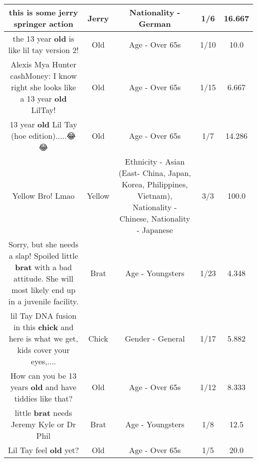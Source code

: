 \documentclass[11pt]{article}
\newlength\mylength
\begin{document}
\begin{center}
\begin{longtable}{|C{.65\mylength}|C{.30\mylength}|C{.12\mylength}|C{.12\mylength}|C{.12\mylength}|}
  \small this is some \textbf{jerry} springer action\normalsize   & Jerry & Nationality - German & 1/6 & 16.667 \\  \hline
  \small the 13 year \textbf{old} is like lil tay version 2!\normalsize   & Old & Age - Over 65s & 1/10 & 10.0 \\  \hline
  \small Alexis Mya Hunter cashMoney: I know right she looks like a 13 year \textbf{old} LilTay!\normalsize   & Old & Age - Over 65s & 1/15 & 6.667 \\  \hline
  \small 13 year \textbf{old} Lil Tay (hoe edition).....😂😂\normalsize   & Old & Age - Over 65s & 1/7 & 14.286 \\  \hline
  \small Yellow Bro! Lmao\normalsize   & Yellow & Ethnicity - Asian (East- China, Japan, Korea, Philippines, Vietnam), Nationality - Chinese, Nationality - Japanese & 3/3 & 100.0 \\  \hline
  \small Sorry, but she needs a slap! Spoiled little \textbf{brat} with a bad attitude. She will most likely end up in a juvenile facility.\normalsize   & Brat & Age - Youngsters & 1/23 & 4.348 \\  \hline
  \small lil Tay DNA fusion in this \textbf{chick} and here is what we get, kids cover your eyes,....\normalsize   & Chick & Gender - General & 1/17 & 5.882 \\  \hline
  \small How can you be 13 years \textbf{old} and have tiddies like that?\normalsize   & Old & Age - Over 65s & 1/12 & 8.333 \\  \hline
  \small little \textbf{brat} needs Jeremy Kyle or Dr Phil\normalsize   & Brat & Age - Youngsters & 1/8 & 12.5 \\  \hline
  \small Lil Tay feel \textbf{old} yet?\normalsize   & Old & Age - Over 65s & 1/5 & 20.0 \\  \hline

\end{longtable}
\end{center}
\end{document}
